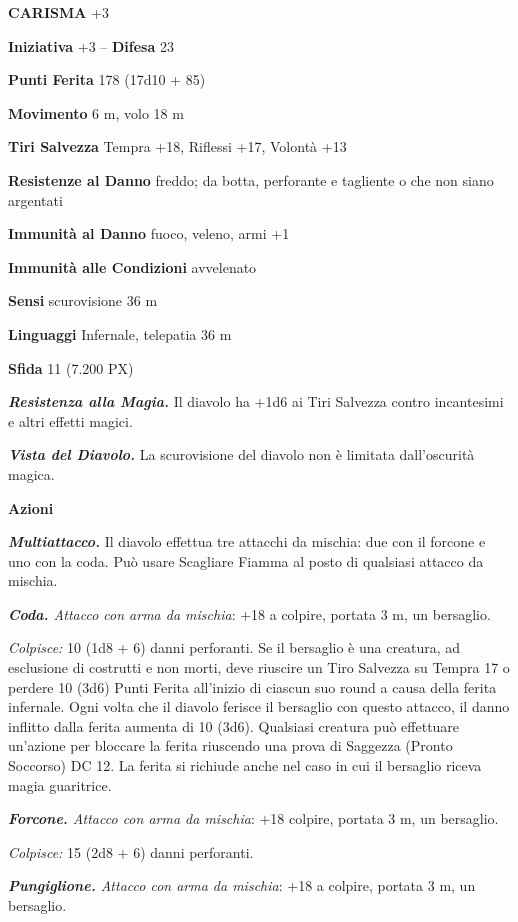 \begin{multicols}{2}
\textbf{CARISMA} +3

\textbf{Iniziativa} +3 -- \textbf{Difesa} 23

\textbf{Punti Ferita} 178 (17d10 + 85)

\textbf{Movimento} 6 m, volo 18 m

\textbf{Tiri Salvezza} Tempra +18, Riflessi +17, Volontà +13

\textbf{Resistenze al Danno} freddo; da botta, perforante e tagliente o che non siano argentati

\textbf{Immunità al Danno} fuoco, veleno, armi +1

\textbf{Immunità alle Condizioni} avvelenato

\textbf{Sensi} scurovisione 36 m

\textbf{Linguaggi} Infernale, telepatia 36 m

\textbf{Sfida} 11 (7.200 PX)

\textit{\textbf{Resistenza alla Magia.}} Il diavolo ha +1d6 ai Tiri Salvezza contro incantesimi e altri effetti magici.

\textit{\textbf{Vista del Diavolo.}} La scurovisione del diavolo non è limitata dall'oscurità magica.

\textbf{Azioni}

\textit{\textbf{Multiattacco.}} Il diavolo effettua tre attacchi da mischia: due con il forcone e uno con la coda. Può usare Scagliare Fiamma al posto di qualsiasi attacco da mischia.

\textit{\textbf{Coda.} Attacco con arma da mischia}: +18 a colpire, portata 3 m, un bersaglio.

\textit{Colpisce:} 10 (1d8 + 6) danni perforanti. Se il bersaglio è una creatura, ad esclusione di costrutti e non morti, deve riuscire un Tiro Salvezza su Tempra 17 o perdere 10 (3d6) Punti Ferita all'inizio di ciascun suo round a causa della ferita infernale. Ogni volta che il diavolo ferisce il bersaglio con questo attacco, il danno inflitto dalla ferita aumenta di 10 (3d6). Qualsiasi creatura può effettuare un'azione per bloccare la ferita riuscendo una prova di Saggezza (Pronto Soccorso) DC 12. La ferita si richiude anche nel caso in cui il bersaglio riceva magia guaritrice.

\textit{\textbf{Forcone.} Attacco con arma da mischia}: +18 colpire, portata 3 m, un bersaglio.

\textit{Colpisce:} 15 (2d8 + 6) danni perforanti.

\textit{\textbf{Pungiglione.} Attacco con arma da mischia}: +18 a colpire, portata 3 m, un bersaglio.


\end{multicols}
